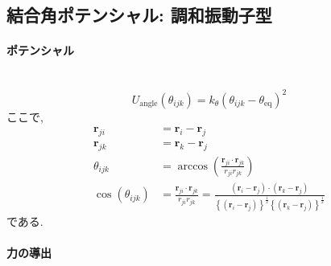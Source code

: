 \clearpage

\subsection{結合角ポテンシャル: 調和振動子型}
\paragraph{ポテンシャル} \
\begin{equation}
    U_{\mathrm{angle}}(\theta_{ijk})
  =
    k_{\theta} (\theta_{ijk} - \theta_{\mathrm{eq}})^{2}
\end{equation}
ここで, 
\begin{align}
    \bm{r}_{ji}
 &= \bm{r}_{i} - \bm{r}_{j}
 \\
    \bm{r}_{jk}
 &= \bm{r}_{k} - \bm{r}_{j}
 \\
    \theta_{ijk}
 &= \arccos \left( \frac{\bm{r}_{ji} \cdot \bm{r}_{jk}}{r_{ji} r_{jk}} \right)
 \\
    \cos(\theta_{ijk})
 &= \frac{\bm{r}_{ji} \cdot \bm{r}_{jk}}{r_{ji} r_{jk}}
  = \frac{(\bm{r}_{i} - \bm{r}_{j}) \cdot (\bm{r}_{k} - \bm{r}_{j})}
         {\left\{(\bm{r}_{i} - \bm{r}_{j})\right\}^{\frac{1}{2}}
          \left\{(\bm{r}_{k} - \bm{r}_{j})\right\}^{\frac{1}{2}}}
\end{align}
である.

\paragraph{力の導出} \

